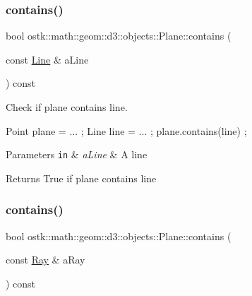 \subsubsection{\texorpdfstring{contains()}{contains()}\hspace{0.1cm}{\footnotesize\ttfamily [3/5]}}
{\footnotesize\ttfamily bool ostk\+::math\+::geom\+::d3\+::objects\+::\+Plane\+::contains (\begin{DoxyParamCaption}\item[{const \hyperlink{classostk_1_1math_1_1geom_1_1d3_1_1objects_1_1_line}{Line} \&}]{a\+Line }\end{DoxyParamCaption}) const}



Check if plane contains line. 


\begin{DoxyCode}
Point plane = ... ;
Line line = ... ;
plane.contains(line) ;
\end{DoxyCode}



\begin{DoxyParams}[1]{Parameters}
\mbox{\tt in}  & {\em a\+Line} & A line \\
\hline
\end{DoxyParams}
\begin{DoxyReturn}{Returns}
True if plane contains line 
\end{DoxyReturn}
\mbox{\label{classostk_1_1math_1_1geom_1_1d3_1_1objects_1_1_plane_a71b173f52939462f312dd0885931ca6a}} 
\subsubsection{\texorpdfstring{contains()}{contains()}\hspace{0.1cm}{\footnotesize\ttfamily [4/5]}}
{\footnotesize\ttfamily bool ostk\+::math\+::geom\+::d3\+::objects\+::\+Plane\+::contains (\begin{DoxyParamCaption}\item[{const \hyperlink{classostk_1_1math_1_1geom_1_1d3_1_1objects_1_1_ray}{Ray} \&}]{a\+Ray }\end{DoxyParamCaption}) const}



